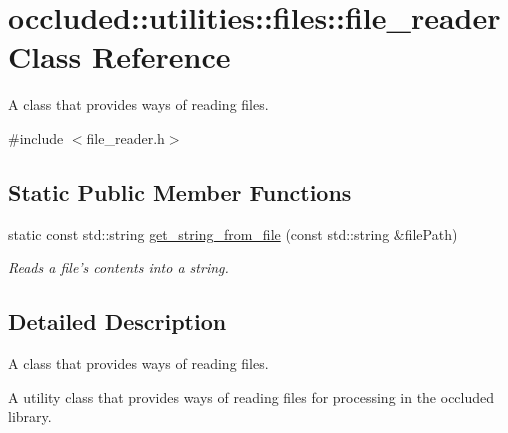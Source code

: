 \hypertarget{classoccluded_1_1utilities_1_1files_1_1file__reader}{\section{occluded\+:\+:utilities\+:\+:files\+:\+:file\+\_\+reader Class Reference}
\label{classoccluded_1_1utilities_1_1files_1_1file__reader}
}


A class that provides ways of reading files.  




{\ttfamily \#include $<$file\+\_\+reader.\+h$>$}

\subsection*{Static Public Member Functions}
\begin{DoxyCompactItemize}
\item 
static const std\+::string \hyperlink{classoccluded_1_1utilities_1_1files_1_1file__reader_a905fd62c6bc5da558c3c303c4a5fe40a}{get\+\_\+string\+\_\+from\+\_\+file} (const std\+::string \&file\+Path)
\begin{DoxyCompactList}\small\item\em Reads a file's contents into a string. \end{DoxyCompactList}\end{DoxyCompactItemize}


\subsection{Detailed Description}
A class that provides ways of reading files. 

A utility class that provides ways of reading files for processing in the occluded library. 

